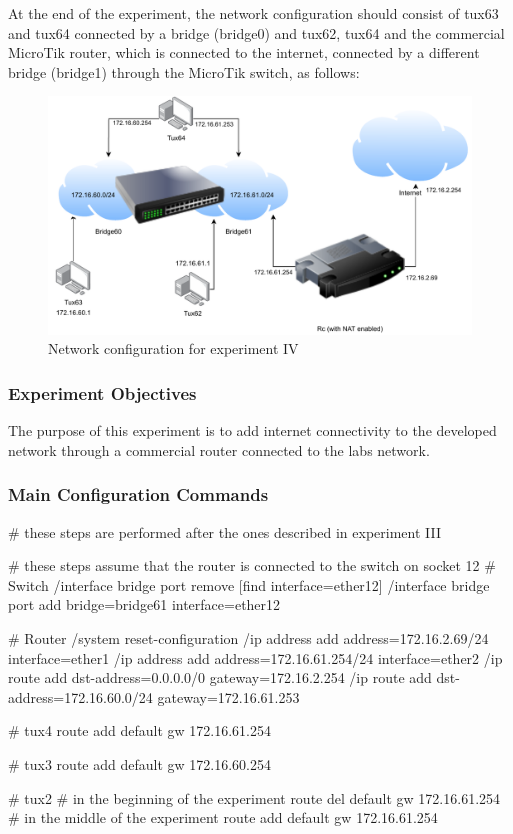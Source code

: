 \documentclass[11pt,a4paper,twocolumn]{article}
\begin{document}
At the end of the experiment, the network configuration should consist of tux63 and tux64 connected by a bridge (bridge0) and tux62, tux64 and the commercial MicroTik router, which is connected to the internet, connected by a different bridge (bridge1) through the MicroTik switch, as follows:

\begin{figure}[H]
    \centering
    \includegraphics[scale=1]{experiment4}
    \caption{Network configuration for experiment IV}
\end{figure}

\subsubsection{Experiment Objectives}

The purpose of this experiment is to add internet connectivity to the developed network through a commercial router connected to the labs network.

\subsubsection{Main Configuration Commands}

\begin{code-bash}
# these steps are performed after the ones described in experiment III

# these steps assume that the router is connected to the switch on socket 12
# Switch
/interface bridge port remove [find interface=ether12]
/interface bridge port add bridge=bridge61 interface=ether12

# Router
/system reset-configuration
/ip address add address=172.16.2.69/24 interface=ether1
/ip address add address=172.16.61.254/24 interface=ether2
/ip route add dst-address=0.0.0.0/0 gateway=172.16.2.254
/ip route add dst-address=172.16.60.0/24 gateway=172.16.61.253

# tux4
route add default gw 172.16.61.254

# tux3
route add default gw 172.16.60.254

# tux2
# in the beginning of the experiment
route del default gw 172.16.61.254
# in the middle of the experiment
route add default gw 172.16.61.254

\end{code-bash}
\end{document}
